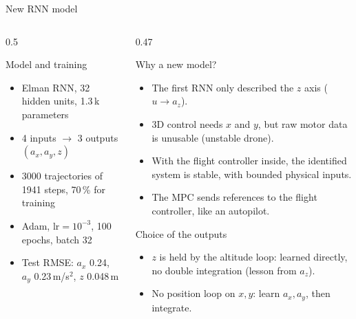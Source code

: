 \begin{frame}{New RNN model}
\begin{columns}[T,onlytextwidth]
\begin{column}{0.5\textwidth}
            \begin{block}{Model and training}
                \footnotesize
                \begin{itemize}\setlength{\itemsep}{0pt}
                    \item Elman RNN, 32 hidden units, 1.3\,k parameters
                    \item 4 inputs $\rightarrow$ 3 outputs $(a_x, a_y, z)$
                    \item 3000 trajectories of 1941 steps, 70\,\% for training
                    \item Adam, $\mathrm{lr}=10^{-3}$, 100 epochs, batch 32
                    \item Test RMSE: $a_x$ 0.24, $a_y$ 0.23\,m/s$^2$,
                    $z$ 0.048\,m
                \end{itemize}
            \end{block}
        \end{column}

        \begin{column}{0.47\textwidth}
            \begin{alertblock}{Why a new model?}
                \footnotesize
                \begin{itemize}\setlength{\itemsep}{0pt}
                    \item The first RNN only described the $z$ axis
                    ($u \rightarrow a_z$).
                    \item 3D control needs $x$ and $y$, but raw motor data is
                    unusable (unstable drone).
                    \item With the flight controller inside, the identified
                    system is stable, with bounded physical inputs.
                    \item The MPC sends references to the flight
                    controller, like an autopilot.
                \end{itemize}
            \end{alertblock}

            \begin{block}{Choice of the outputs}
                \footnotesize
                \begin{itemize}\setlength{\itemsep}{0pt}
                    \item $z$ is held by the altitude loop: learned
                    directly, no double integration (lesson from $a_z$).
                    \item No position loop on $x, y$: learn $a_x, a_y$, then
                    integrate.
                \end{itemize}
            \end{block}
        \end{column}
    \end{columns}
\end{frame}

